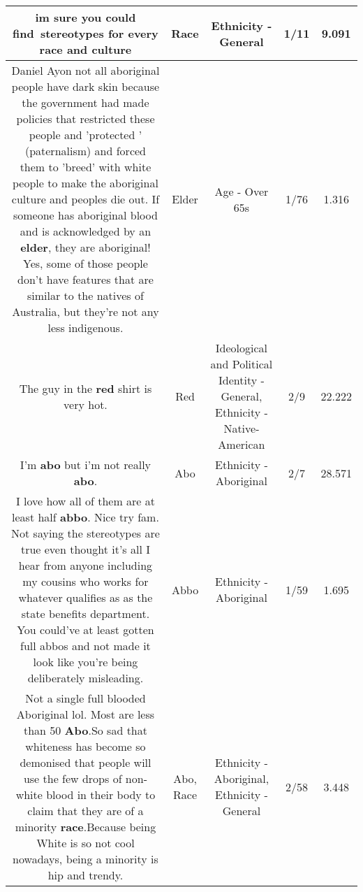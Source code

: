 \documentclass[11pt]{article}
\newlength\mylength
\begin{document}
\begin{center}
\begin{longtable}{|C{.65\mylength}|C{.30\mylength}|C{.12\mylength}|C{.12\mylength}|C{.12\mylength}|}
  \small im sure you could find stereotypes for every \textbf{race} and culture\normalsize   & Race & Ethnicity - General & 1/11 & 9.091 \\  \hline
  \small Daniel Ayon not all aboriginal people have dark skin because the government had made policies that restricted these people and 'protected ' (paternalism) and forced them to 'breed' with white people to make the aboriginal culture and peoples die out. If someone has aboriginal blood and is acknowledged by an \textbf{elder}, they are aboriginal! Yes, some of those people don't have features that are similar to the natives of Australia, but they're not any less indigenous.\normalsize   & Elder & Age - Over 65s & 1/76 & 1.316 \\  \hline
  \small The guy in the \textbf{r\textbf{ed}} shirt is very hot.\normalsize   & Red &  Ideological and Political Identity - General, Ethnicity - Native-American & 2/9 & 22.222 \\  \hline
  \small I'm \textbf{abo} but i'm not really \textbf{abo}.\normalsize   & Abo & Ethnicity - Aboriginal & 2/7 & 28.571 \\  \hline
  \small I love how all of them are at least half \textbf{abbo}. Nice try fam.  Not saying the stereotypes are true even thought it's all I hear from anyone including my cousins who works for whatever qualifies as as the state benefits department. You could've at least gotten full abbos and not made it look like you're being deliberately misleading.\normalsize   & Abbo & Ethnicity - Aboriginal & 1/59 & 1.695 \\  \hline
  \small Not a single full blooded Aboriginal lol. Most are less than 50 \textbf{Abo}.So sad that whiteness has become so demonised that people will use the few drops of non-white blood in their body to claim that they are of a minority \textbf{race}.Because being White is so not cool nowadays, being a minority is hip and trendy.\normalsize   & Abo, Race & Ethnicity - Aboriginal, Ethnicity - General & 2/58 & 3.448 \\  \hline

\end{longtable}
\end{center}
\end{document}
